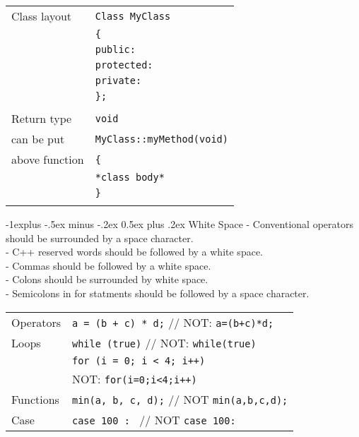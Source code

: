 \documentclass[10pt,landscape]{article}
\makeatletter
\renewcommand{\subsection}{\@startsection{subsection}{2}{0mm}%
                                {-1explus -.5ex minus -.2ex}%
                                {0.5ex plus .2ex}%
                                {\normalfont\normalsize\bfseries}}
\makeatother
\begin{document}
\begin{multicols}{3}
\begin{tabular}{@{}ll@{}}
	Class layout  & \verb!Class MyClass! \\
	              & \verb!{! \\
	              & \hspace{0.2cm} \verb!public:! \\
	              & \hspace{0.2cm} \verb!protected:! \\
	              & \hspace{0.2cm} \verb!private:! \\
	              & \verb!};! \\
	              & \\
	Return type   & \verb!void! \\
	can be put    & \verb!MyClass::myMethod(void)! \\
	above function& \verb!{! \\
	              & \hspace{0.2cm} \verb!*class body*! \\
	              & \verb!}! \\
	              & \\
\end{tabular}

\subsection{White Space}
- Conventional operators should be surrounded by a space character. \\
- C++ reserved words should be followed by a white space. \\
- Commas should be followed by a white space. \\
- Colons should be surrounded by white space. \\
- Semicolons in for statments should be followed by a space character. \\


\begin{tabular}{@{}ll@{}}
	Operators     & \verb!a = (b + c) * d;! // NOT: \verb!a=(b+c)*d;! \\
	Loops         & \verb!while (true)! // NOT: \verb!while(true)! \\
	              & \verb!for (i = 0; i < 4; i++)! \\ 
	              & NOT: \verb!for(i=0;i<4;i++)!\\
	Functions     & \verb!min(a, b, c, d);! // NOT \verb!min(a,b,c,d);! \\
	Case          & \verb!case 100 : ! // NOT \verb!case 100:! \\
	

\end{tabular}
\end{multicols}
\end{document}
